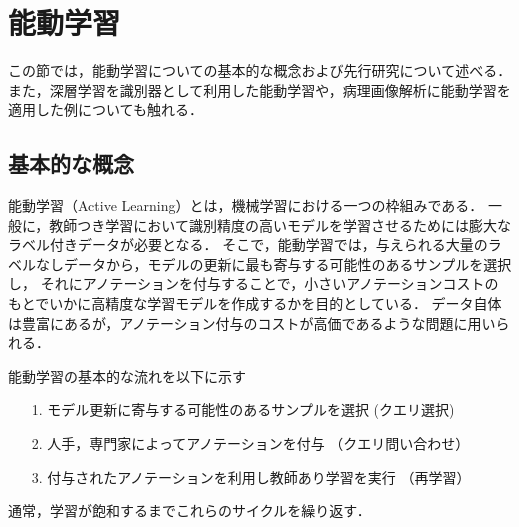 \section{能動学習}

この節では，能動学習についての基本的な概念および先行研究について述べる．
また，深層学習を識別器として利用した能動学習や，病理画像解析に能動学習を適用した例についても触れる．

\subsection{基本的な概念}
能動学習（Active Learning）\cite{settles2010active}とは，機械学習における一つの枠組みである．
一般に，教師つき学習において識別精度の高いモデルを学習させるためには膨大なラベル付きデータが必要となる．
そこで，能動学習では，与えられる大量のラベルなしデータから，モデルの更新に最も寄与する可能性のあるサンプルを選択し，
それにアノテーションを付与することで，小さいアノテーションコストのもとでいかに高精度な学習モデルを作成するかを目的としている．
データ自体は豊富にあるが，アノテーション付与のコストが高価であるような問題に用いられる．

能動学習の基本的な流れを以下に示す
\begin{itemize}
    \item[1.] モデル更新に寄与する可能性のあるサンプルを選択 (クエリ選択)
    \item[2.] 人手，専門家によってアノテーションを付与 （クエリ問い合わせ）
    \item[3.] 付与されたアノテーションを利用し教師あり学習を実行 （再学習）
\end{itemize}
通常，学習が飽和するまでこれらのサイクルを繰り返す．

